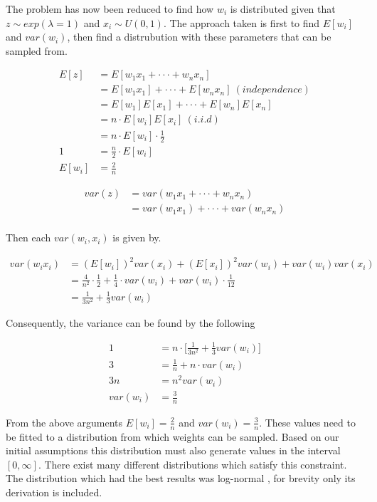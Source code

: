 The problem has now been reduced to find how $w_i$ is distributed given that $z \sim exp(\lambda = 1)$ and $x_i \sim U(0,1)$. The approach taken is first to find $E[w_i]$ and $var(w_i)$, then find a distrubution with these parameters that can be sampled from.

\begin{align*}
E[z] &= E[w_1x_1 + \cdot \cdot \cdot + w_nx_n]\\
&= E[w_1x_1] + \cdot \cdot \cdot + E[w_nx_n]\ (independence)\\
&= E[w_1]E[x_1] + \cdot \cdot \cdot + E[w_n]E[x_n]\\
&= n \cdot E[w_i]E[x_i]\ (i.i.d)\\
&= n \cdot E[w_i] \cdot \frac{1}{2}\\
1 &= \frac{n}{2} \cdot E[w_i]\\
E[w_i] &= \frac{2}{n}
\end{align*}

\begin{align*}
var(z) &= var(w_1x_1 + \cdot \cdot \cdot + w_nx_n)\\
&= var(w_1x_1) + \cdot \cdot \cdot + var(w_nx_n)\\
\end{align*}

Then each $var(w_i, x_i)$ is given by.

\begin{align*}
var(w_ix_i) &= (E[w_i])^2var(x_i) + (E[x_i])^2var(w_i) + var(w_i)var(x_i)\\
&= \frac{4}{n^2} \cdot \frac{1}{2} + \frac{1}{4} \cdot var(w_i) + var(w_i) \cdot \frac{1}{12}\\
&= \frac{1}{3 n^2} + \frac{1}{3}var(w_i)
\end{align*}

Consequently, the variance can be found by the following

\begin{align*}
1 &= n \cdot \big[\frac{1}{3 n^2} + \frac{1}{3}var(w_i)\big]\\
3 &= \frac{1}{n} + n \cdot var(w_i)\\
3n &= n^2 var(w_i)\\
var(w_i) &= \frac{3}{n}
\end{align*}

From the above arguments $E[w_i] = \frac{2}{n}$ and $var(w_i) = \frac{3}{n}$. These values need to be fitted to a distribution from which weights can be sampled. Based on our initial assumptions this distribution must also generate values in the interval $[0, \infty]$. There exist many different distributions which satisfy this constraint. The distribution which had the best results was log-normal \cite{balakrishnan2006continuous}, for brevity only its derivation is included.

